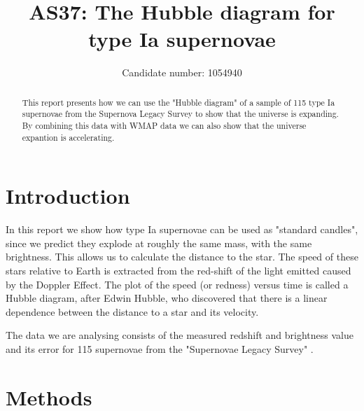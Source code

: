 \documentclass[11pt]{article}
\title{AS37: The Hubble diagram for type Ia supernovae}
\author{Candidate number: 1054940}
\begin{document}
\maketitle


\begin{abstract}
This report presents how we can use the "Hubble diagram" of a sample of 115 type Ia supernovae from the Supernova Legacy Survey to show that the universe is expanding. By combining this data with WMAP data we can also show that the universe expantion is accelerating. 
\end{abstract}


\section{Introduction}
In this report we show how type Ia supernovae can be used as "standard candles", since we predict they explode at roughly the same mass, with the same brightness. This allows us to calculate the distance to the star. The speed of these stars relative to Earth is extracted from the red-shift of the light emitted caused by the Doppler Effect. The plot of the speed (or redness) versus time is called a Hubble diagram, after Edwin Hubble, who discovered that there is a linear dependence between the distance to a star and its velocity. 

The data we are analysing consists of the measured redshift and brightness value and its error for 115 supernovae from the "Supernovae Legacy Survey" \cite{SN_legacy_survey}. 


\section{Methods}
\end{document}
